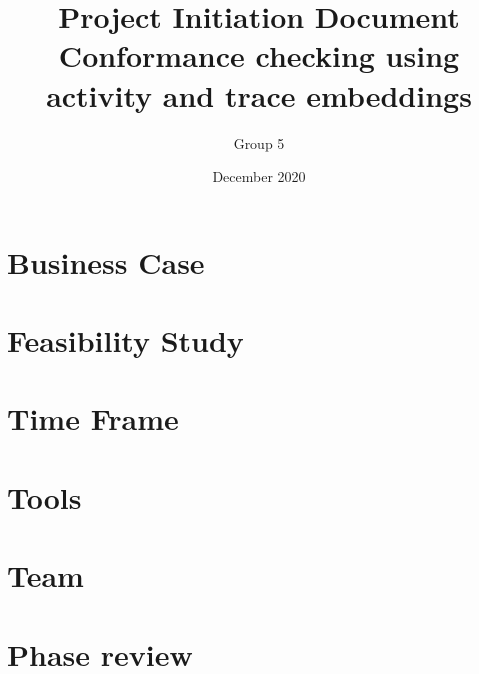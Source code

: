 \documentclass{article}
\title{Project Initiation Document \\ Conformance checking using activity and trace embeddings}
\author{Group 5 }
\date{December 2020}
\begin{document}
\maketitle

\newpage
\tableofcontents
\newpage

\section{Business Case}


\section{Feasibility Study}


\section{Time Frame}


\section{Tools}


\section{Team}


\section{Phase review}



\end{document}
